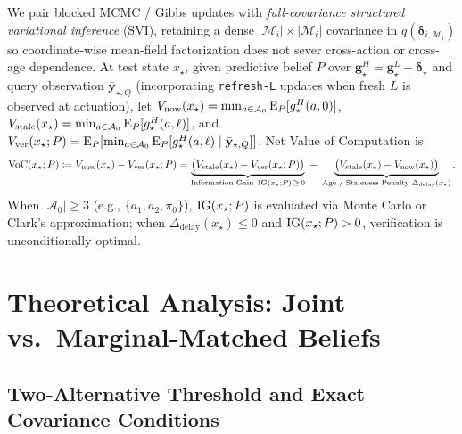 We pair blocked MCMC / Gibbs updates with \emph{full-covariance structured variational inference} (SVI), retaining a dense $|\mathcal{M}_i| \times |\mathcal{M}_i|$ covariance in $q(\boldsymbol\delta_{i,\mathcal{M}_i})$ so coordinate-wise mean-field factorization does not sever cross-action or cross-age dependence. At test state $x_\star$, given predictive belief $P$ over $\mathbf{g}^H_\star = \mathbf{g}^L_\star + \boldsymbol\delta_\star$ and query observation $\bar{\mathbf{y}}_{\star,Q}$ (incorporating \texttt{refresh-L} updates when fresh $L$ is observed at actuation), let $V_{\mathrm{now}}(x_\star) = \min_{a \in \mathcal{A}_0} \operatorname{E}_P[g^H_\star(a,0)]$, $V_{\mathrm{stale}}(x_\star) = \min_{a \in \mathcal{A}_0} \operatorname{E}_P[g^H_\star(a,\ell)]$, and $V_{\mathrm{ver}}(x_\star; P) = \operatorname{E}_P[\min_{a \in \mathcal{A}_0} \operatorname{E}_P[g^H_\star(a,\ell) \mid \bar{\mathbf{y}}_{\star,Q}]]$. Net Value of Computation is
\begin{equation}\label{eq:voc-decomp}
\operatorname{VoC}(x_\star; P) \coloneqq V_{\mathrm{now}}(x_\star) - V_{\mathrm{ver}}(x_\star; P)
= \underbrace{\big(V_{\mathrm{stale}}(x_\star) - V_{\mathrm{ver}}(x_\star; P)\big)}_{\text{Information Gain } \operatorname{IG}(x_\star; P)\,\ge\,0}
\;-\;
\underbrace{\big(V_{\mathrm{stale}}(x_\star) - V_{\mathrm{now}}(x_\star)\big)}_{\text{Age / Staleness Penalty } \Delta_{\mathrm{delay}}(x_\star)}.
\end{equation}
When $|\mathcal{A}_0| \ge 3$ (e.g., $\{a_1, a_2, \pi_0\}$), $\operatorname{IG}(x_\star; P)$ is evaluated via Monte Carlo or Clark's approximation; when $\Delta_{\mathrm{delay}}(x_\star) \le 0$ and $\operatorname{IG}(x_\star; P) > 0$, verification is unconditionally optimal.

\section{Theoretical Analysis: Joint vs.\ Marginal-Matched Beliefs}

\subsection{Two-Alternative Threshold and Exact Covariance Conditions}

